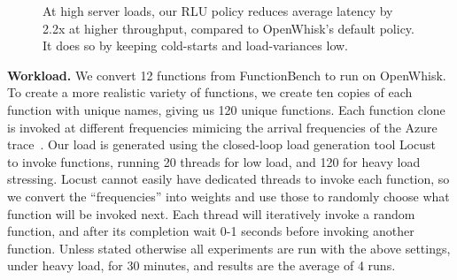 \begin{figure}[ht] 
  \caption{At high server loads, our RLU policy reduces average latency by 2.2x at higher throughput, compared to OpenWhisk's default policy. It does so by keeping cold-starts and load-variances low.}
  \label{fig:high-load}
\end{figure}



\noindent \textbf{Workload.}
We convert 12 functions from FunctionBench \cite{kim_functionbench_2019} to run on OpenWhisk.
To create a more realistic variety of functions, we create ten copies of each function with unique names, giving us 120 unique functions. 
Each function clone is invoked at different frequencies mimicing the arrival frequencies of the Azure trace~\cite{shahrad_serverless_2020}. 
Our load is generated using the closed-loop load generation tool Locust~\cite{locust} to invoke functions, running 20 threads for low load, and 120 for heavy load stressing.
Locust cannot easily have dedicated threads to invoke each function, so we convert the ``frequencies'' into weights and use those to randomly choose what function will be invoked next.
Each thread will iteratively invoke a random function, and after its completion wait 0-1 seconds before invoking another function.
Unless stated otherwise all experiments are run with the above settings, under heavy load, for 30 minutes, and results are the average of 4 runs.

